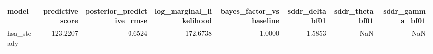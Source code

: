 \begin{tabular}{lrrrrrrr}
\toprule
model & predictive\_score & posterior\_predictive\_rmse & log\_marginal\_likelihood & bayes\_factor\_vs\_baseline & sddr\_delta\_bf01 & sddr\_theta\_bf01 & sddr\_gamma\_bf01 \\
\midrule
hsa\_steady & -123.2207 & 0.6524 & -172.6738 & 1.0000 & 1.5853 & NaN & NaN \\
\bottomrule
\end{tabular}
